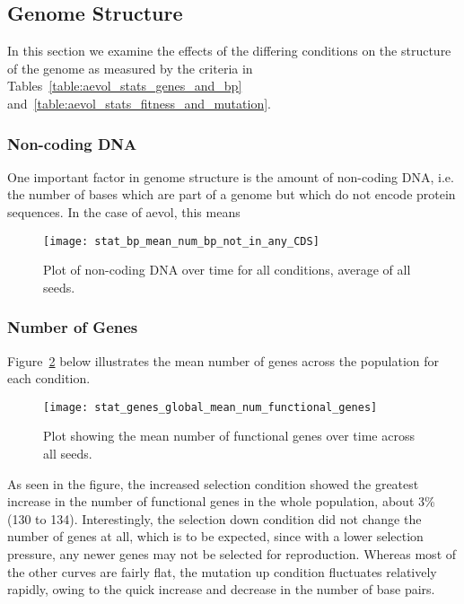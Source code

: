 \subsection{Genome Structure}
In this section we examine the effects of the differing conditions on the structure of the genome as measured by the criteria in Tables~\ref{table:aevol_stats_genes_and_bp} and~\ref{table:aevol_stats_fitness_and_mutation}. 

\subsubsection{Non-coding DNA}
One important factor in genome structure is the amount of non-coding DNA, i.e. the number of bases which are part of a genome but which do not encode protein sequences. In the case of aevol, this means 
\begin{figure}[H]
	\centering
	\texttt{[image: stat\_bp\_mean\_num\_bp\_not\_in\_any\_CDS]}
	\caption[Non-coding DNA]{Plot of non-coding DNA over time for all conditions, average of all seeds.}
	\label{fig:mean_non-coding_DNA}
\end{figure}

\subsubsection{Number of Genes}\label{sec:number_of_functional_genes}
Figure~\ref{fig:mean_num_functional_genes} below illustrates the mean number of genes across the population for each condition.  
\begin{figure}[H]
	\centering
	\texttt{[image: stat\_genes\_global\_mean\_num\_functional\_genes]}
	\caption[Mean number of functional genes]{Plot showing the mean number of functional genes over time across all seeds.}
	\label{fig:mean_num_functional_genes}
\end{figure}
As seen in the figure, the increased selection condition showed the greatest increase in the number of functional genes in the whole population, about 3\% (130 to 134). Interestingly, the selection down condition did not change the number of genes at all, which is to be expected, since with a lower selection pressure, any newer genes may not be selected for reproduction. Whereas most of the other curves are fairly flat, the mutation up condition fluctuates relatively rapidly, owing to the quick increase and decrease in the number of base pairs. 

